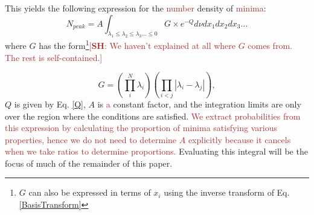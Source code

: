 \documentclass[12pt]{article}
\newcommand{\re}[1]{\textcolor{blue}{[{\bf RE}: #1]}}
\newcommand{\SH}[1]{\textcolor{brown}{[{\bf SH}: #1]}}
\newcommand{\sh}[1]{\textcolor{brown}{#1}}
\begin{document}
This yields the following expression for the \sh{number} density of \sh{minima}:
%
\begin{equation} \label{DensityOfPeaks}
N_{peak} = A \int_{\lambda_1 \leq \lambda_2 \leq \lambda_3 \ldots \leq 0} G \times e^{-Q} d\nu dx_1 dx_2 dx_3 \ldots
\end{equation}
%
\noindent where $G$ has the form\footnote{$G$ can also be expressed in terms of $x_i$ using the inverse transform of Eq. \ref{BasisTransform}}\SH{We haven't explained at all where $G$ comes from. The rest is self-contained.}

\begin{equation}
G = \left(\prod_{i}^{N} \lambda_i \right)\left(\prod_{i<j} |\lambda_i-\lambda_j|\right),
\end{equation} 
%
$Q$ is given by Eq. \ref{Q}, $A$ is \sh{a} constant factor, and the integration limits are only over the region where the conditions are satisfied. \sh{We extract probabilities from this expression by calculating the proportion of minima satisfying various properties, hence we do not need to determine $A$ explicitly because it cancels when we take ratios to determine proportions.} Evaluating this integral will be the focus of much of the remainder of this paper.



\end{document}
